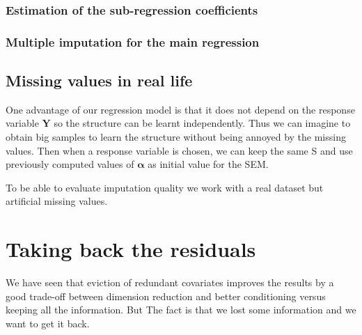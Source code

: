 \documentclass[12pt,a4paper]{report}
\begin{document}
		\subsection{Estimation of the sub-regression coefficients}
		\subsection{Multiple imputation for the main regression}
	\section{Missing values in real life}
		One advantage of our regression model is that it does not depend on the response variable $\boldsymbol{Y}$ so the structure can be learnt independently. Thus we can imagine to obtain big samples to learn the structure without being annoyed by the missing values. Then when a response variable is chosen, we can keep the same S and use previously computed values of $\boldsymbol{\alpha}$ as initial value for the SEM. 
		
		To be able to evaluate imputation quality we work with a real dataset but artificial missing values.
				
		
\chapter{Taking back the residuals}
	We have seen that eviction of redundant covariates improves the results by a good trade-off between dimension reduction and better conditioning versus keeping all the information. But The fact is that we lost some information and we want to get it back.
\end{document}
